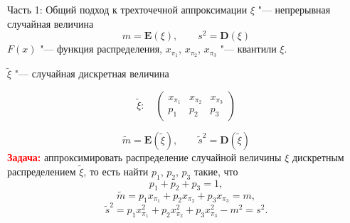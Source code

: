 \documentclass[ucs, notheorems, handout]{beamer}
\begin{document}
\begin{frame}{Часть 1: Общий подход к трехточечной аппроксимации}
	$\xi$ "--- непрерывная случайная величина  \[m = \mathbf E(\xi), \quad\quad s^{2} = \mathbf D(\xi)\]  $F(x)$ "--- функция распределения,
	$x_{\pi_{1}}$, $x_{\pi_{2}}$, $x_{\pi_{3}}$ "--- квантили $\xi$.
	
	$\tilde{\xi}$ "--- случайная дискретная величина 
	
	\[\tilde{\xi}:\quad\begin{pmatrix} 
		x_{\pi_{1}}&x_{\pi_{2}}&x_{\pi_{3}}\\ 
		p_{1} &  p_{2}  & p_{3}
	\end{pmatrix}\]
	
	\[\tilde{m} = \mathbf E(\tilde{\xi}), \quad\quad \tilde{s}^{2} = \mathbf D(\tilde{\xi})\]
	\textcolor{red}{\textbf{Задача:}} аппроксимировать распределение случайной величины $\xi$ дискретным распределением $\tilde{\xi}$, то есть найти $p_{1}$, $p_{2}$, $p_{3}$ такие, что 
	\begin{equation*}
		p_{1} + p_{2} + p_{3} = 1, \label{1}
	\end{equation*}
	\begin{equation*}
		\tilde{m} = p_{1}x_{\pi_{1}} + p_{2}x_{\pi_{2}} + p_{3}x_{\pi_{3}} = m, \label{2}
	\end{equation*}
	\begin{equation*}
		\tilde{s}^{2} = p_{1} x_{\pi_{1}}^{2} + p_{2} x_{\pi_{2}}^{2} + p_{3} x_{\pi_{3}}^{2} - m^{2} = s^{2}. \label{3}
	\end{equation*}
	
	
\end{frame}
\end{document}

